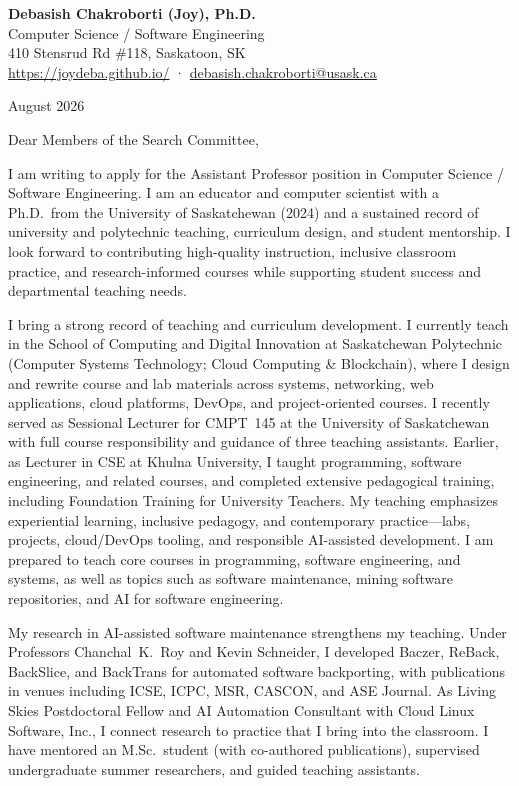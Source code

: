 \documentclass[10pt]{letter}
\begin{document}
\begin{center}
{\large\bfseries Debasish Chakroborti (Joy), Ph.D.}\\[0.2em]
Computer Science / Software Engineering\\
410 Stensrud Rd \#118, Saskatoon, SK\\
\href{https://joydeba.github.io/}{https://joydeba.github.io/} ·
\href{mailto:debasish.chakroborti@usask.ca}{debasish.chakroborti@usask.ca}
\end{center}

\vspace{0.3em}
\noindent August 2026

\vspace{0.2em}
\noindent Dear Members of the Search Committee,

I am writing to apply for the Assistant Professor position in Computer Science / Software Engineering. I am an educator and computer scientist with a Ph.D.\ from the University of Saskatchewan (2024) and a sustained record of university and polytechnic teaching, curriculum design, and student mentorship. I look forward to contributing high-quality instruction, inclusive classroom practice, and research-informed courses while supporting student success and departmental teaching needs.

I bring a strong record of teaching and curriculum development. I currently teach in the School of Computing and Digital Innovation at Saskatchewan Polytechnic (Computer Systems Technology; Cloud Computing \& Blockchain), where I design and rewrite course and lab materials across systems, networking, web applications, cloud platforms, DevOps, and project-oriented courses. I recently served as Sessional Lecturer for CMPT~145 at the University of Saskatchewan with full course responsibility and guidance of three teaching assistants. Earlier, as Lecturer in CSE at Khulna University, I taught programming, software engineering, and related courses, and completed extensive pedagogical training, including Foundation Training for University Teachers. My teaching emphasizes experiential learning, inclusive pedagogy, and contemporary practice---labs, projects, cloud/DevOps tooling, and responsible AI-assisted development. I am prepared to teach core courses in programming, software engineering, and systems, as well as topics such as software maintenance, mining software repositories, and AI for software engineering.

My research in AI-assisted software maintenance strengthens my teaching. Under Professors Chanchal~K.~Roy and Kevin Schneider, I developed Baczer, ReBack, BackSlice, and BackTrans for automated software backporting, with publications in venues including ICSE, ICPC, MSR, CASCON, and ASE Journal. As Living Skies Postdoctoral Fellow and AI Automation Consultant with Cloud Linux Software, Inc., I connect research to practice that I bring into the classroom. I have mentored an M.Sc.\ student (with co-authored publications), supervised undergraduate summer researchers, and guided teaching assistants.
\end{document}
